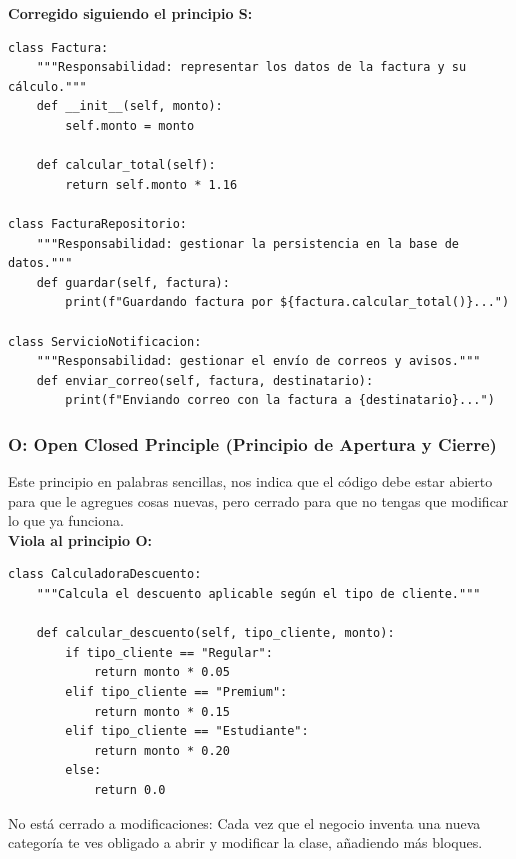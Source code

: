 \documentclass{article}
\begin{document}
	    		\textbf{Corregido siguiendo el principio S:}
    			\begin{verbatim}
class Factura:
    """Responsabilidad: representar los datos de la factura y su cálculo."""
    def __init__(self, monto):
        self.monto = monto

    def calcular_total(self):
        return self.monto * 1.16

class FacturaRepositorio:
    """Responsabilidad: gestionar la persistencia en la base de datos."""
    def guardar(self, factura):
        print(f"Guardando factura por ${factura.calcular_total()}...")

class ServicioNotificacion:
    """Responsabilidad: gestionar el envío de correos y avisos."""
    def enviar_correo(self, factura, destinatario):
        print(f"Enviando correo con la factura a {destinatario}...")
    			\end{verbatim}
	\newpage
			\subsubsection*{O: Open Closed Principle (Principio de Apertura y Cierre)}
				Este principio en palabras sencillas, nos indica que el código debe estar abierto para que le 
				agregues cosas nuevas, pero cerrado para que no tengas que modificar lo que ya funciona.\\

				\textbf{Viola al principio O:}
        		\begin{verbatim}
class CalculadoraDescuento:
    """Calcula el descuento aplicable según el tipo de cliente."""

    def calcular_descuento(self, tipo_cliente, monto):
        if tipo_cliente == "Regular":
            return monto * 0.05
        elif tipo_cliente == "Premium":
            return monto * 0.15
        elif tipo_cliente == "Estudiante":
            return monto * 0.20
        else:
            return 0.0
        		\end{verbatim}
        			No está cerrado a modificaciones: Cada vez que el negocio inventa una nueva categoría te ves obligado a abrir y modificar la clase, añadiendo más bloques.\\ \\
        		
\end{document}
